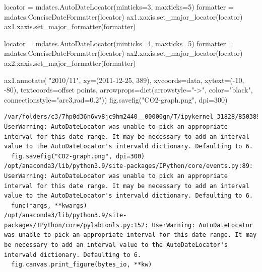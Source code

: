 \documentclass[
  letterpaper,
  DIV=11,
  numbers=noendperiod,
  oneside]{scrreprt}
\newenvironment{Shaded}{\begin{snugshade}}{\end{snugshade}}
\newcommand{\BuiltInTok}[1]{\textcolor[rgb]{0.00,0.23,0.31}{#1}}
\newcommand{\DecValTok}[1]{\textcolor[rgb]{0.68,0.00,0.00}{#1}}
\newcommand{\NormalTok}[1]{\textcolor[rgb]{0.00,0.23,0.31}{#1}}
\newcommand{\OperatorTok}[1]{\textcolor[rgb]{0.37,0.37,0.37}{#1}}
\newcommand{\StringTok}[1]{\textcolor[rgb]{0.13,0.47,0.30}{#1}}
\begin{document}
\begin{Shaded}
\begin{Highlighting}[]
\NormalTok{locator }\OperatorTok{=}\NormalTok{ mdates.AutoDateLocator(minticks}\OperatorTok{=}\DecValTok{3}\NormalTok{, maxticks}\OperatorTok{=}\DecValTok{5}\NormalTok{)}
\NormalTok{formatter }\OperatorTok{=}\NormalTok{ mdates.ConciseDateFormatter(locator)}
\NormalTok{ax1.xaxis.set\_major\_locator(locator)}
\NormalTok{ax1.xaxis.set\_major\_formatter(formatter)}

\NormalTok{locator }\OperatorTok{=}\NormalTok{ mdates.AutoDateLocator(minticks}\OperatorTok{=}\DecValTok{4}\NormalTok{, maxticks}\OperatorTok{=}\DecValTok{5}\NormalTok{)}
\NormalTok{formatter }\OperatorTok{=}\NormalTok{ mdates.ConciseDateFormatter(locator)}
\NormalTok{ax2.xaxis.set\_major\_locator(locator)}
\NormalTok{ax2.xaxis.set\_major\_formatter(formatter)}

\NormalTok{ax1.annotate(}
    \StringTok{"2010/11"}\NormalTok{,}
\NormalTok{    xy}\OperatorTok{=}\NormalTok{(}\StringTok{\textquotesingle{}2011{-}12{-}25\textquotesingle{}}\NormalTok{, }\DecValTok{389}\NormalTok{),  xycoords}\OperatorTok{=}\StringTok{\textquotesingle{}data\textquotesingle{}}\NormalTok{,}
\NormalTok{    xytext}\OperatorTok{=}\NormalTok{(}\OperatorTok{{-}}\DecValTok{10}\NormalTok{, }\OperatorTok{{-}}\DecValTok{80}\NormalTok{), textcoords}\OperatorTok{=}\StringTok{\textquotesingle{}offset points\textquotesingle{}}\NormalTok{,}
\NormalTok{    arrowprops}\OperatorTok{=}\BuiltInTok{dict}\NormalTok{(arrowstyle}\OperatorTok{=}\StringTok{"{-}\textgreater{}"}\NormalTok{,}
\NormalTok{                    color}\OperatorTok{=}\StringTok{"black"}\NormalTok{,}
\NormalTok{                    connectionstyle}\OperatorTok{=}\StringTok{"arc3,rad=0.2"}\NormalTok{))}
\NormalTok{fig.savefig(}\StringTok{"CO2{-}graph.png"}\NormalTok{, dpi}\OperatorTok{=}\DecValTok{300}\NormalTok{)}
\end{Highlighting}
\end{Shaded}

\begin{verbatim}
/var/folders/c3/7hp0d36n6vv8jc9hm2440__00000gn/T/ipykernel_31828/850389963.py:42: UserWarning: AutoDateLocator was unable to pick an appropriate interval for this date range. It may be necessary to add an interval value to the AutoDateLocator's intervald dictionary. Defaulting to 6.
  fig.savefig("CO2-graph.png", dpi=300)
/opt/anaconda3/lib/python3.9/site-packages/IPython/core/events.py:89: UserWarning: AutoDateLocator was unable to pick an appropriate interval for this date range. It may be necessary to add an interval value to the AutoDateLocator's intervald dictionary. Defaulting to 6.
  func(*args, **kwargs)
/opt/anaconda3/lib/python3.9/site-packages/IPython/core/pylabtools.py:152: UserWarning: AutoDateLocator was unable to pick an appropriate interval for this date range. It may be necessary to add an interval value to the AutoDateLocator's intervald dictionary. Defaulting to 6.
  fig.canvas.print_figure(bytes_io, **kw)
\end{verbatim}
\end{document}
